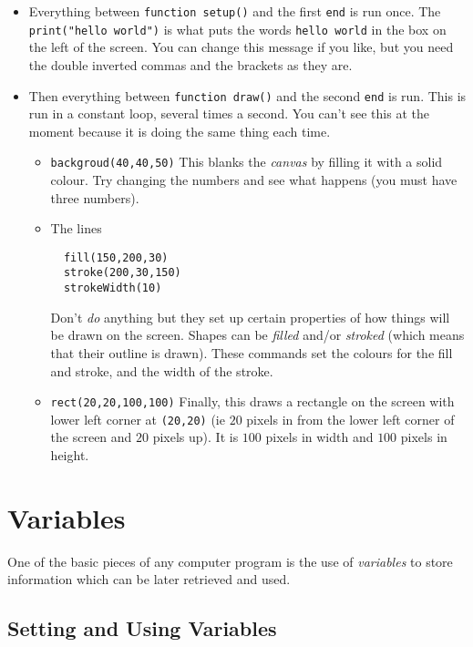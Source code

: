 \documentclass[
  xhtml,%
  use filename%
]{internet}
\begin{document}
\begin{itemize}
\item Everything between \verb+function setup()+ and the first \verb+end+ is run once.
The \verb+print("hello world")+ is what puts the words \verb+hello world+ in the box on the left of the screen.
You can change this message if you like, but you need the double inverted commas and the brackets as they are.

\item Then everything between \verb+function draw()+ and the second \verb+end+ is run.
This is run in a constant loop, several times a second.
You can't see this at the moment because it is doing the same thing each time.

\begin{itemize}
\item \verb+backgroud(40,40,50)+ This blanks the \emph{canvas} by filling it with a solid colour.
Try changing the numbers and see what happens (you must have three numbers).

\item The lines

\begin{verbatim}
  fill(150,200,30)
  stroke(200,30,150)
  strokeWidth(10)
\end{verbatim}

Don't \emph{do} anything but they set up certain properties of how things will be drawn on the screen.
Shapes can be \emph{filled} and/or \emph{stroked} (which means that their outline is drawn).
These commands set the colours for the fill and stroke, and the width of the stroke.

\item \verb+rect(20,20,100,100)+ Finally, this draws a rectangle on the screen with lower left corner at \verb+(20,20)+ (ie \(20\) pixels in from the lower left corner of the screen and \(20\) pixels up).
It is \(100\) pixels in width and \(100\) pixels in height.
\end{itemize}
\end{itemize}

\section{Variables}

One of the basic pieces of any computer program is the use of \emph{variables} to store information which can be later retrieved and used.

\subsection{Setting and Using Variables}
\end{document}
